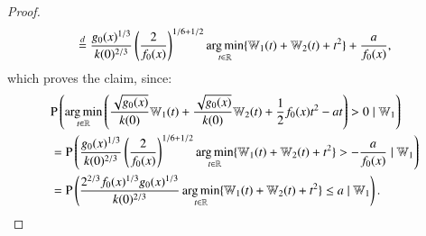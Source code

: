 \begin{proof}
\begin{align*}
&\, \, \, \, \, \stackrel{d}{=} \frac{g_0(x)^{1/3}}{k(0)^{2/3}} \left( \frac{2}{f_0(x)} \right)^{1/6+1/2} \operatorname*{arg\,min}_{t \in \mathbb{R}} \{ \mathbb{W}_1(t) + \mathbb{W}_2(t) + t^2 \} + \frac{a}{f_0(x)},	
\end{align*}
which proves the claim, since:
\begin{align*}
&\mathrm{P} \left(\operatorname*{arg\,min}_{t \in \mathbb{R}} \left( \frac{\sqrt{g_0(x)}}{k(0)} \mathbb{W}_1(t) + \frac{\sqrt{g_0(x)}}{k(0)} \mathbb{W}_2(t) + \frac{1}{2} f_0(x) t^2 - at \right) > 0 \mid \mathbb{W}_1  \right) \\
&=\mathrm{P} \left( \frac{g_0(x)^{1/3}}{k(0)^{2/3}} \left( \frac{2}{f_0(x)} \right)^{1/6+1/2} \operatorname*{arg\,min}_{t \in \mathbb{R}} \{ \mathbb{W}_1(t) + \mathbb{W}_2(t) + t^2 \} > - \frac{a}{f_0(x)} \mid \mathbb{W}_1  \right)	\\
&= \mathrm{P} \left( \frac{2^{2/3} f_0(x)^{1/3} g_0(x)^{1/3}}{k(0)^{2/3}} \operatorname*{arg\,min}_{t \in \mathbb{R}} \{\mathbb{W}_1(t) + \mathbb{W}_2(t) + t^2 \} \le a \mid \mathbb{W}_1 \right).
\end{align*}

\end{proof}

